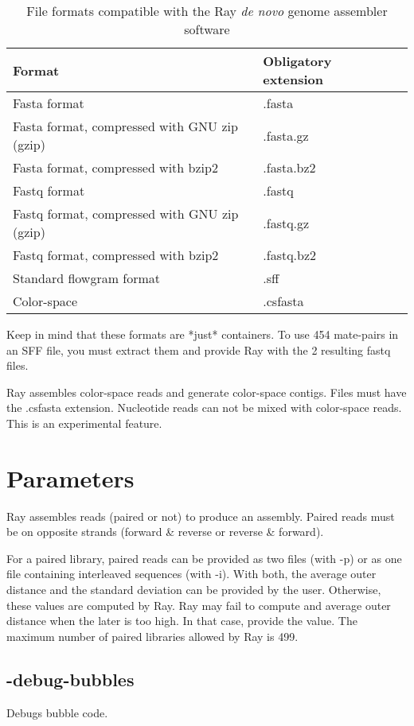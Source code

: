 \documentclass{article}
\begin{document}
\begin{table}[h]
\caption{File formats compatible with the Ray \emph{de novo} genome assembler software}\label{formats}
\begin{tabular}{lll}
\hline
Format & Obligatory extension \\
\hline
Fasta format & .fasta\\
Fasta format, compressed with GNU zip (gzip) & .fasta.gz \\
Fasta format, compressed with bzip2 & .fasta.bz2 \\
Fastq format & .fastq\\
Fastq format, compressed with GNU zip (gzip) & .fastq.gz \\
Fastq format, compressed with bzip2 & .fastq.bz2 \\
Standard flowgram format & .sff \\
Color-space & .csfasta \\
\hline
\end{tabular}
\end{table}

Keep in mind that these formats are *just* containers.
To use 454 mate-pairs in an SFF file, you must extract them
and provide Ray with the 2 resulting fastq files.


Ray assembles color-space reads and generate color-space contigs.
Files must have the .csfasta extension. Nucleotide reads can not be mixed
with color-space reads. This is an experimental feature.


\section{Parameters}

Ray assembles reads (paired or not) to produce an assembly.
Paired reads must be on opposite strands (forward \& reverse or reverse \& forward).

For a paired library, paired reads can be provided as two files (with -p) or as one file containing interleaved
sequences (with -i).
With both, the average outer distance and the standard deviation can be provided by the user. Otherwise, these values are
computed by Ray. Ray may fail to compute and average outer distance when the later is too high.
In that case, provide the value.
The maximum  number of paired libraries allowed by Ray is 499.

\subsection{      
 -debug-bubbles
}
              Debugs bubble code.
\end{document}

